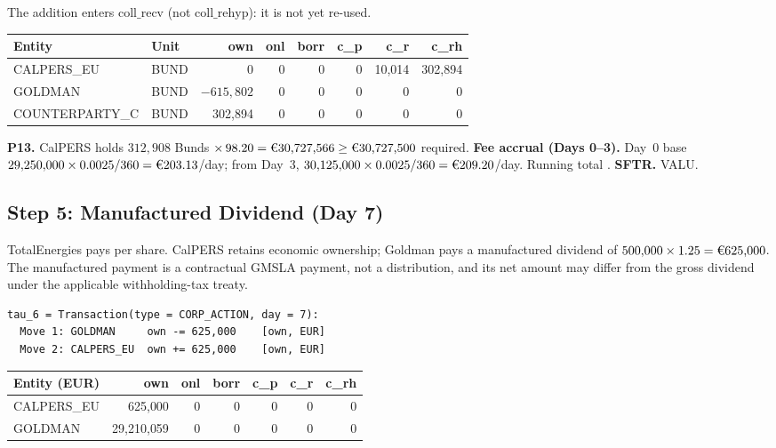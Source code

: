 \noindent The addition enters $\mathrm{coll\_recv}$ (not $\mathrm{coll\_rehyp}$): it is not yet re-used.

\begin{center}\small
\begin{tabular}{l l r r r r r r}
\toprule
\textbf{Entity} & \textbf{Unit} & own & onl & borr & c\_p & c\_r & c\_rh \\
\midrule
CALPERS\_EU & BUND & 0 & 0 & 0 & 0 & 10{,}014 & 302{,}894 \\
GOLDMAN & BUND & $-615{,}802$ & 0 & 0 & 0 & 0 & 0 \\
COUNTERPARTY\_C & BUND & 302{,}894 & 0 & 0 & 0 & 0 & 0 \\
\bottomrule
\end{tabular}
\end{center}

\noindent\textbf{P13.} CalPERS holds $312{,}908$ Bunds $\times\,98.20 = \text{\EUR{30,727,566}} \geq \text{\EUR{30,727,500}}$ required. \checkmark\quad
\textbf{Fee accrual (Days 0--3).} Day~0 base $29{,}250{,}000 \times 0.0025/360 = \text{\EUR{203.13}}$/day; from Day~3, $30{,}125{,}000 \times 0.0025/360 = \text{\EUR{209.20}}$/day. Running total .\quad
\textbf{SFTR.} VALU.

\subsection{Step 5: Manufactured Dividend (Day 7)}
\label{sec:eu-step5}

TotalEnergies pays  per share. CalPERS retains economic ownership; Goldman pays a manufactured dividend of $500{,}000 \times 1.25 = \text{\EUR{625,000}}$. The manufactured payment is a contractual GMSLA payment, not a distribution, and its net amount may differ from the gross dividend under the applicable withholding-tax treaty.

\begin{lstlisting}
tau_6 = Transaction(type = CORP_ACTION, day = 7):
  Move 1: GOLDMAN     own -= 625,000    [own, EUR]
  Move 2: CALPERS_EU  own += 625,000    [own, EUR]
\end{lstlisting}

\begin{center}\small
\begin{tabular}{l r r r r r r}
\toprule
\textbf{Entity (EUR)} & own & onl & borr & c\_p & c\_r & c\_rh \\
\midrule
CALPERS\_EU & 625{,}000 & 0 & 0 & 0 & 0 & 0 \\
GOLDMAN & 29{,}210{,}059 & 0 & 0 & 0 & 0 & 0 \\
\bottomrule
\end{tabular}
\end{center}

